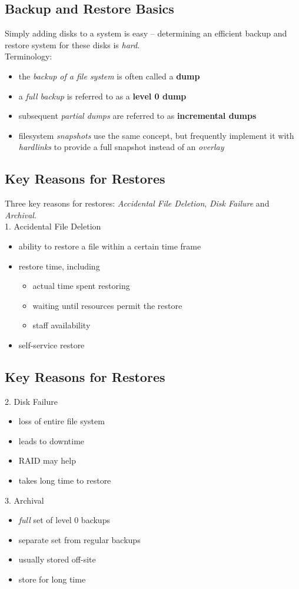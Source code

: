\documentclass[xga]{xdvislides}
\begin{document}
\subsection{Backup and Restore Basics}
Simply adding disks to a system is easy -- determining an efficient backup and
restore system for these disks is {\em hard}.
\\

Terminology:
\begin{itemize}
	\item the {\em backup of a file system} is often called a {\bf dump}
	\item a {\em full backup} is referred to as a {\bf level 0 dump}
	\item subsequent {\em partial dumps} are referred to as {\bf incremental dumps}
	\item filesystem {\em snapshots} use the same concept, but frequently implement
		it with {\em hardlinks} to provide a full snapshot instead of an {\em
		overlay}
\end{itemize}

\subsection{Key Reasons for Restores}
Three key reasons for restores: {\em Accidental File Deletion}, {\em Disk
Failure} and {\em Archival}.
\\

1. Accidental File Deletion
\begin{itemize}
	\item ability to restore a file within a certain time frame
	\item restore time, including
		\begin{itemize}
			\item actual time spent restoring
			\item waiting until resources permit the restore
			\item staff availability
		\end{itemize}
	\item self-service restore
\end{itemize}

\subsection{Key Reasons for Restores}
2. Disk Failure
\begin{itemize}
	\item loss of entire file system
	\item leads to downtime
	\item RAID may help
	\item takes long time to restore
\end{itemize}
\addvspace{.5in}
3. Archival
\begin{itemize}
	\item {\em full} set of level 0 backups
	\item separate set from regular backups
	\item usually stored off-site
	\item store for long time
\end{itemize}
\end{document}
